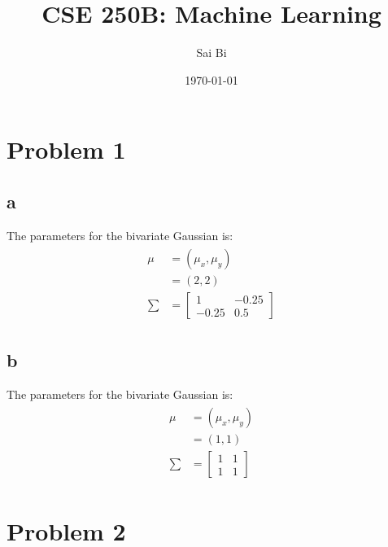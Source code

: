 \documentclass[a4paper,11pt]{article}
\theoremstyle{mytheor}
\begin{document}
\title{CSE 250B: Machine Learning}

\author{Sai Bi}

\date{\today}

\maketitle

\section*{Problem 1}
\subsection*{a}
The parameters for the bivariate Gaussian is:
\begin{align}
	\begin{split}
	\mu &= (\mu_x, \mu_y) \\
	    &= (2, 2)  \\
	\sum &= \begin{bmatrix}
				1  & -0.25 \\
				-0.25 & 0.5 
			\end{bmatrix}
	\end{split}
\end{align}

\subsection*{b}
The parameters for the bivariate Gaussian is:
\begin{align}
\begin{split}
\mu &= (\mu_x, \mu_y) \\
&= (1, 1)  \\
\sum &= \begin{bmatrix}
1  & 1 \\
1 & 1 
\end{bmatrix}
\end{split}
\end{align}

\section*{Problem 2}
\end{document}
